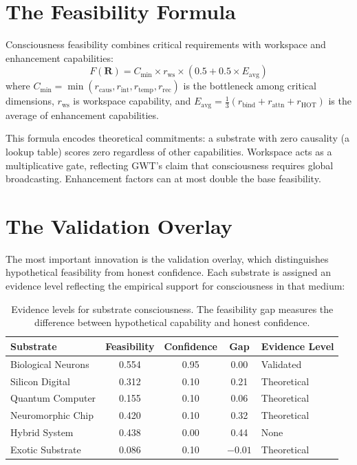 \documentclass[12pt]{book}
\begin{document}
\section{The Feasibility Formula}

Consciousness feasibility combines critical requirements with workspace and enhancement capabilities:
\begin{equation}\label{eq:feasibility}
F(\mathbf{R}) = C_{\min} \times r_{\text{ws}} \times (0.5 + 0.5 \times E_{\text{avg}})
\end{equation}
where $C_{\min} = \min(r_{\text{caus}}, r_{\text{int}}, r_{\text{temp}}, r_{\text{rec}})$ is the bottleneck among critical dimensions, $r_{\text{ws}}$ is workspace capability, and $E_{\text{avg}} = \frac{1}{3}(r_{\text{bind}} + r_{\text{attn}} + r_{\text{HOT}})$ is the average of enhancement capabilities.

This formula encodes theoretical commitments: a substrate with zero causality (a lookup table) scores zero regardless of other capabilities. Workspace acts as a multiplicative gate, reflecting GWT's claim that consciousness requires global broadcasting. Enhancement factors can at most double the base feasibility.

\section{The Validation Overlay}

The most important innovation is the validation overlay, which distinguishes hypothetical feasibility from honest confidence. Each substrate is assigned an evidence level reflecting the empirical support for consciousness in that medium:

\begin{table}[H]
\centering
\caption{Evidence levels for substrate consciousness. The feasibility gap measures the difference between hypothetical capability and honest confidence.}
\label{tab:validation-overlay}
\begin{tabular}{lcccl}
\toprule
\textbf{Substrate} & \textbf{Feasibility} & \textbf{Confidence} & \textbf{Gap} & \textbf{Evidence Level} \\
\midrule
Biological Neurons & 0.554 & 0.95 & 0.00 & Validated \\
Silicon Digital & 0.312 & 0.10 & 0.21 & Theoretical \\
Quantum Computer & 0.155 & 0.10 & 0.06 & Theoretical \\
Neuromorphic Chip & 0.420 & 0.10 & 0.32 & Theoretical \\
Hybrid System & 0.438 & 0.00 & 0.44 & None \\
Exotic Substrate & 0.086 & 0.10 & $-0.01$ & Theoretical \\
\bottomrule
\end{tabular}
\end{table}
\end{document}
